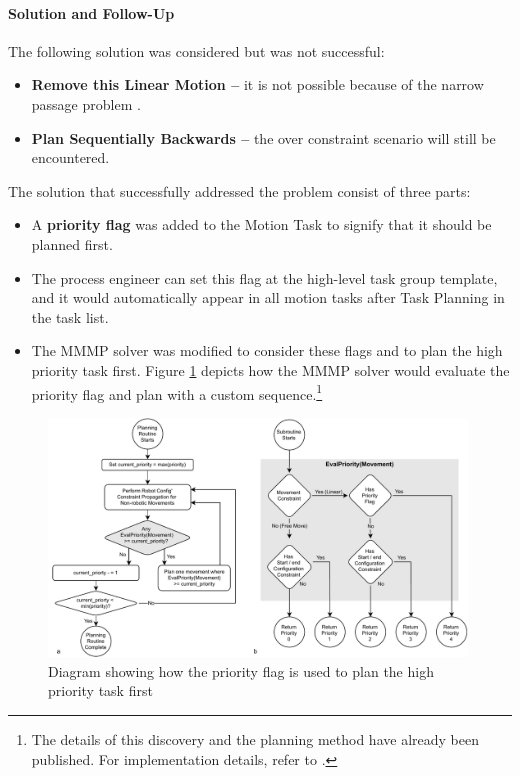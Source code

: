 \paragraph{Solution and Follow-Up}

The following solution was considered but was not successful:

\begin{itemize}
	\item \textbf{Remove this Linear Motion --} it is not possible because of the narrow passage problem .
	\item \textbf{Plan Sequentially Backwards --} the over constraint scenario will still be encountered.

\end{itemize}

The solution that successfully addressed the problem consist of three parts:
\begin{itemize}
	\item A \textbf{priority flag }was added to the Motion Task to signify that it should be planned first.

	\item The process engineer can set this flag at the high-level task group template, and it would automatically appear in all motion tasks after Task Planning in the task list.

	\item The MMMP solver was modified to consider these flags and to plan the high priority task first. Figure \ref{fig:priority-flag} depicts how the MMMP solver would evaluate the priority flag and plan with a custom sequence.\footnote{The details of this discovery and the planning method have already been published. For implementation details, refer to \parencite{huangNewAnalogProtocol2021}.}

\end{itemize}

\begin{figure}[!h]
    \centering
    \includegraphics[width=0.99\textwidth]{images/6a/image47.pdf}
    \caption{Diagram showing how the priority flag is used to plan the high priority task first}
    \label{fig:priority-flag}
\end{figure}

